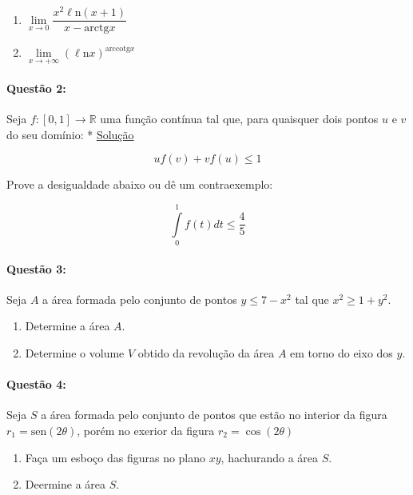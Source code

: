 \documentclass[12pt,a4paper]{article}
\newcommand{\R}{\mathbb{R}}
\newcommand{\Ln}{\ell\mathrm{n}}
\begin{document}
\begin{enumerate}[label=(\alph*)]

\item $\lim\limits_{x\to 0} \dfrac{x^2\Ln(x+1)}{x-\mathrm{arctg}x}$

\item $\lim\limits_{x\to +\infty} (\Ln x)^{\mathrm{arccotg}x}$

\end{enumerate}

\paragraph{Questão 2: }

Seja $f: [0,1] \rightarrow \R$ uma função contínua tal que, para quaisquer dois pontos $u$ e $v$ do seu domínio: \hfill \scriptsize \hypertarget{calculovf2017q2volta}{* }\hyperlink{calculovf2017q2ida}{Solução} \normalsize

$$uf(v) + vf(u) \le 1$$

Prove a desigualdade abaixo ou dê um contraexemplo:

$$\int\limits_{0}^{1} f(t)dt \le \dfrac{4}{5}$$

\paragraph{Questão 3: }

Seja $A$ a área formada pelo conjunto de pontos $y\le 7-x^2$ tal que $x^2 \ge 1+y^2$.

\begin{enumerate}[label=(\alph*)]

\item Determine a área $A$.

\item Determine o volume $V$ obtido da revolução da área $A$ em torno do eixo dos $y$.

\end{enumerate}

\paragraph{Questão 4: }

Seja $S$ a área formada pelo conjunto de pontos que estão no interior da figura $r_1 = \mathrm{sen}(2\theta)$, porém no exerior da figura $r_2 = \cos(2\theta)$

\begin{enumerate}[label=(\alph*)]

\item Faça um esboço das figuras no plano $xy$, hachurando a área $S$.

\item Deermine a área $S$.


\end{enumerate}
\end{document}
